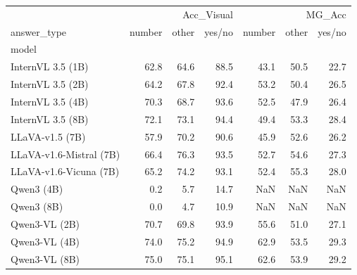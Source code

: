 \begin{tabular}{lrrrrrr}
\toprule
 & \multicolumn{3}{r}{Acc_Visual} & \multicolumn{3}{r}{MG_Acc} \\
answer_type & number & other & yes/no & number & other & yes/no \\
model &  &  &  &  &  &  \\
\midrule
InternVL 3.5 (1B) & 62.8 & 64.6 & 88.5 & 43.1 & 50.5 & 22.7 \\
InternVL 3.5 (2B) & 64.2 & 67.8 & 92.4 & 53.2 & 50.4 & 26.5 \\
InternVL 3.5 (4B) & 70.3 & 68.7 & 93.6 & 52.5 & 47.9 & 26.4 \\
InternVL 3.5 (8B) & 72.1 & 73.1 & 94.4 & 49.4 & 53.3 & 28.4 \\
LLaVA-v1.5 (7B) & 57.9 & 70.2 & 90.6 & 45.9 & 52.6 & 26.2 \\
LLaVA-v1.6-Mistral (7B) & 66.4 & 76.3 & 93.5 & 52.7 & 54.6 & 27.3 \\
LLaVA-v1.6-Vicuna (7B) & 65.2 & 74.2 & 93.1 & 52.4 & 55.3 & 28.0 \\
Qwen3 (4B) & 0.2 & 5.7 & 14.7 & NaN & NaN & NaN \\
Qwen3 (8B) & 0.0 & 4.7 & 10.9 & NaN & NaN & NaN \\
Qwen3-VL (2B) & 70.7 & 69.8 & 93.9 & 55.6 & 51.0 & 27.1 \\
Qwen3-VL (4B) & 74.0 & 75.2 & 94.9 & 62.9 & 53.5 & 29.3 \\
Qwen3-VL (8B) & 75.0 & 75.1 & 95.1 & 62.6 & 53.9 & 29.2 \\
\bottomrule
\end{tabular}
